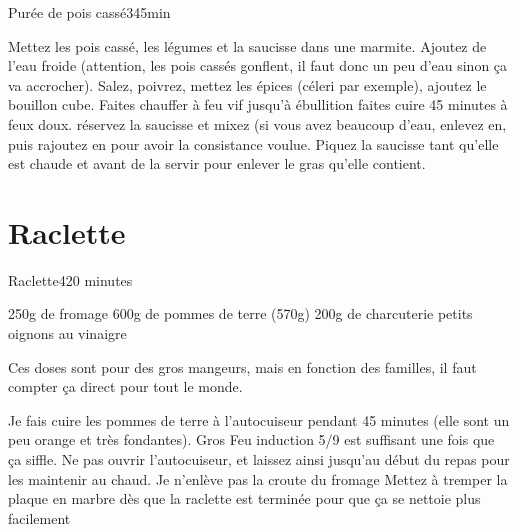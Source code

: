 {\begin{recette}{Purée de pois cassé}{3}{45min}{}
\begin{preparation}
\etape Mettez les pois cassé, les légumes et la saucisse dans une marmite. Ajoutez de l'eau froide (attention, les pois cassés gonflent, il faut donc un peu d'eau sinon ça va accrocher). Salez, poivrez, mettez les 
épices (céleri par exemple), ajoutez le bouillon cube. 
\etape Faites chauffer à feu vif jusqu'à ébullition
\etape faites cuire 45 minutes à feux doux.
\etape réservez la saucisse et mixez (si vous avez beaucoup d'eau, enlevez en, puis rajoutez en pour avoir la consistance 
voulue.
\etape Piquez la saucisse tant qu'elle est chaude et avant de la servir pour enlever le gras qu'elle contient. 
\end{preparation}

\end{recette}


\section{Raclette}
\begin{recette}{Raclette}{4}{20 minutes}{}
\begin{ingredients}
\ingredient 250g de fromage
\ingredient 600g de pommes de terre (570g)
\ingredient 200g de charcuterie
\ingredient petits oignons au vinaigre
\begin{remarque}
 Ces doses sont pour des gros mangeurs, mais en fonction des familles, il faut compter ça direct pour tout le monde.
\end{remarque}

\end{ingredients}

\begin{preparation}
\etape Je fais cuire les pommes de terre à l'autocuiseur pendant 45 minutes (elle sont un peu orange et très fondantes). Gros Feu induction 5/9 est suffisant une fois que ça siffle. Ne pas ouvrir l'autocuiseur, et laissez ainsi jusqu'au début du repas pour les maintenir au chaud. 
\etape Je n'enlève pas la croute du fromage
\etape Mettez à tremper la plaque en marbre dès que la raclette est terminée pour que ça se nettoie plus facilement
\end{preparation}
\end{recette}

}
